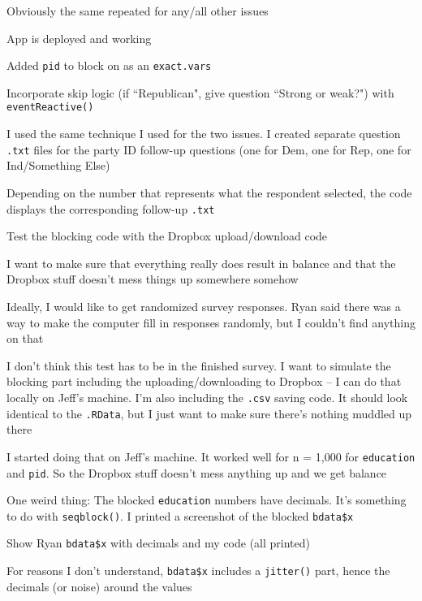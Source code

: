 \begin{coi}
\begin{coi}
\begin{coi}
						\item Obviously the same repeated for any/all other issues
								\item App is deployed and working
					\end{coi}
				\item Added \texttt{pid} to block on as an \texttt{exact.vars}
				\item Incorporate skip logic (if ``Republican", give question ``Strong or weak?") with \texttt{eventReactive()}
					\begin{coi}
						\item I used the same technique I used for the two issues. I created separate question \texttt{.txt} files for the party ID follow-up questions (one for Dem, one for Rep, one for Ind/Something Else)
						\item Depending on the number that represents what the respondent selected, the code displays the corresponding follow-up \texttt{.txt}
					\end{coi}
				\item Test the blocking code with the Dropbox upload/download code
					\begin{coi}
						\item I want to make sure that everything really does result in balance and that the Dropbox stuff doesn't mess things up somewhere somehow
						\item Ideally, I would like to get randomized survey responses. Ryan said there was a way to make the computer fill in responses randomly, but I couldn't find anything on that
						\item I don't think this test has to be in the finished survey. I want to simulate the blocking part including the uploading/downloading to Dropbox -- I can do that locally on Jeff's machine. I'm also including the \texttt{.csv} saving code. It should look identical to the \texttt{.RData}, but I just want to make sure there's nothing muddled up there
						\item I started doing that on Jeff's machine. It worked well for n = 1,000 for \texttt{education} and \texttt{pid}. So the Dropbox stuff doesn't mess anything up and we get balance
						\item One weird thing: The blocked \texttt{education} numbers have decimals. It's something to do with \texttt{seqblock()}. I printed a screenshot of the blocked \texttt{bdata\$x}
						\item Show Ryan \texttt{bdata\$x} with decimals and my code (all printed)
						\item For reasons I don't understand, \texttt{bdata\$x} includes a \texttt{jitter()} part, hence the decimals (or noise) around the values

\end{coi}
\end{coi}
\end{coi}

